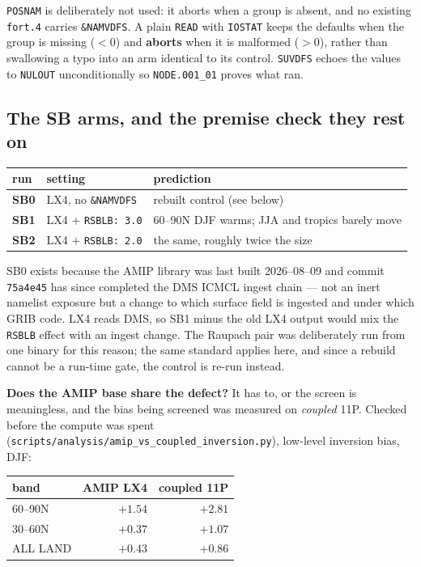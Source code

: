 \documentclass[10pt]{article}
\begin{document}
\texttt{POSNAM} is deliberately not used: it aborts when a group is absent, and no
existing \texttt{fort.4} carries \texttt{\&NAMVDFS}. A plain \texttt{READ} with
\texttt{IOSTAT} keeps the defaults when the group is missing ($<0$) and \textbf{aborts}
when it is malformed ($>0$), rather than swallowing a typo into an arm identical to its
control. \texttt{SUVDFS} echoes the values to \texttt{NULOUT} unconditionally so
\texttt{NODE.001\_01} proves what ran.

\subsection{The SB arms, and the premise check they rest on}\label{sub:r31sb}

\begin{center}\small
\begin{tabular}{llp{}}
\toprule
run & setting & prediction \\
\midrule
\textbf{SB0} & LX4, no \texttt{\&NAMVDFS} & rebuilt control (see below) \\
\textbf{SB1} & LX4 $+$ \texttt{RSBLB: 3.0} & 60--90N DJF warms; JJA and tropics barely move \\
\textbf{SB2} & LX4 $+$ \texttt{RSBLB: 2.0} & the same, roughly twice the size \\
\bottomrule
\end{tabular}
\end{center}

SB0 exists because the AMIP library was last built 2026--08--09 and commit
\texttt{75a4e45} has since completed the DMS ICMCL ingest chain --- not an inert namelist
exposure but a change to which surface field is ingested and under which GRIB code. LX4
reads DMS, so SB1 minus the old LX4 output would mix the \texttt{RSBLB} effect with an
ingest change. The Raupach pair was deliberately run from one binary for this reason; the
same standard applies here, and since a rebuild cannot be a run-time gate, the control is
re-run instead.

\textbf{Does the AMIP base share the defect?} It has to, or the screen is meaningless, and
the bias being screened was measured on \emph{coupled} 11P. Checked before the compute was
spent (\texttt{scripts/analysis/amip\_vs\_coupled\_inversion.py}), low-level inversion
bias, DJF:

\begin{center}\small
\begin{tabular}{lrr}
\toprule
band & AMIP LX4 & coupled 11P \\
\midrule
60--90N  & $+1.54$ & $+2.81$ \\
30--60N  & $+0.37$ & $+1.07$ \\
ALL LAND & $+0.43$ & $+0.86$ \\
\bottomrule
\end{tabular}
\end{center}
\end{document}
